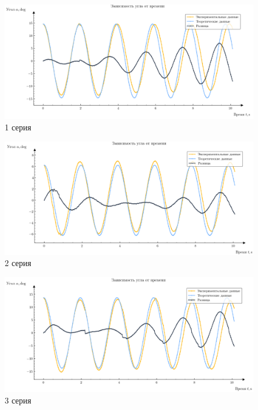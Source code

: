 \documentclass{report}
\begin{document}
\begin{enumerate}
\begin{figure}[H]
    \begin{center}
    \includegraphics[width=1.11\textwidth]{1.png}
    \caption{1 серия}
\end{center}
\end{figure}
\begin{figure}[H]
    \begin{center}
    \includegraphics[width=1.11\textwidth]{2.png}
    \caption{2 серия}
\end{center}
\end{figure}
\begin{figure}[H]
    \begin{center}
    \includegraphics[width=1.11\textwidth]{3.png}
    \caption{3 серия}
\end{center}
\end{figure}


\end{enumerate}
\end{document}
